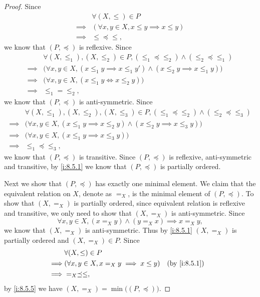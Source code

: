 \begin{proof}
  Since
  \begin{align*}
             & \forall (X, \leq) \in P                          \\
    \implies & (\forall x, y \in X, x \leq y \implies x \leq y) \\
    \implies & \leq \preceq \leq,
  \end{align*}
  we know that \((P, \preceq)\) is reflexive.
  Since
  \begin{align*}
             & \forall (X, \leq_1), (X, \leq_2) \in P, (\leq_1 \preceq \leq_2) \land (\leq_2 \preceq \leq_1)          \\
    \implies & \big(\forall x, y \in X, (x \leq_1 y \implies x \leq_1 y') \land (x \leq_2 y \implies x \leq_1 y)\big) \\
    \implies & \big(\forall x, y \in X, (x \leq_1 y \iff x \leq_2 y)\big)                                             \\
    \implies & \leq_1 = \leq_2,
  \end{align*}
  we know that \((P, \preceq)\) is anti-symmetric.
  Since
  \begin{align*}
             & \forall (X, \leq_1), (X, \leq_2), (X, \leq_3) \in P, (\leq_1 \preceq \leq_2) \land (\leq_2 \preceq \leq_3) \\
    \implies & \big(\forall x, y \in X, (x \leq_1 y \implies x \leq_2 y) \land (x \leq_2 y \implies x \leq_3 y)\big)      \\
    \implies & \big(\forall x, y \in X, (x \leq_1 y \implies x \leq_3 y)\big)                                             \\
    \implies & \leq_1 \preceq \leq_3,
  \end{align*}
  we know that \((P, \preceq)\) is transitive.
  Since \((P, \preceq)\) is reflexive, anti-symmetric and transitive, by \cref{i:8.5.1} we know that \((P, \preceq)\) is partially ordered.

  Next we show that \((P, \preceq)\) has exactly one minimal element.
  We claim that the equivalent relation on \(X\), denote as \(=_X\), is the minimal element of \((P, \preceq)\).
  To show that \((X, =_X)\) is partially ordered, since equivalent relation is reflexive and transitive, we only need to show that \((X, =_X)\) is anti-symmetric.
  Since
  \[
    \forall x, y \in X, (x =_X y) \land (y =_X x) \implies x =_X y,
  \]
  we know that \((X, =_X)\) is anti-symmetric.
  Thus by \cref{i:8.5.1} \((X, =_X)\) is partially ordered and \((X, =_X) \in P\).
  Since
  \begin{align*}
             & \forall (X, \leq) \in P                                           \\
    \implies & (\forall x, y \in X, x =_X y \implies x \leq y) &  & \by{i:8.5.1} \\
    \implies & =_X \preceq \leq,
  \end{align*}
  by \cref{i:8.5.5} we have \((X, =_X) = \min\big((P, \preceq)\big)\).


\end{proof}

